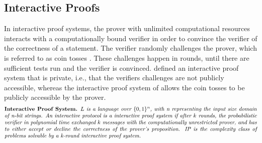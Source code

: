 \subsection{Interactive Proofs}

In interactive proof systems, the prover with unlimited computational resources interacts with a computationally bound verifier in order to convince the verifier of the correctness of a statement. The verifier randomly challenges the prover, which is referred to as coin tosses \citep{GoldwasserCoinTosses}. These challenges happen in rounds, until there are sufficient tests run and the verifier is convinced. \citet{GoldwasserIPs} defined an interactive proof system that is private, i.e., that the verifiers challenges are not publicly accessible, whereas the interactive proof system of \citet{BabaiIPs} allows the coin tosses to be publicly accessible by the prover.
\begin{align*}
    \text{\parbox{450pt}{\textbf{Interactive Proof System.} \textit{\(L\) is a language over \(\{0,1\}^n\), with n representing the input size domain of n-bit strings. An interactive protocol is a interactive proof system if after \(k\) rounds, the probabilistic verifier in polynomial time exchanged \(k\) messages with the computationally unrestricted prover, and has to either accept or decline the correctness of the prover's proposition. IP is the complexity class of problems solvable by a k-round interactive proof system.}}}
\end{align*}
